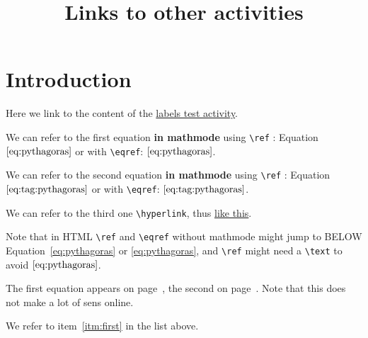 \documentclass{ximera}
\title{Links to other activities}
\begin{document}
\begin{abstract}
\end{abstract}
\maketitle
\label{xim:labelsFromOtherActivity}

\section{Introduction}
\label{sec:intro} %
 

Here we link to the content of the \hyperlink{xim:labels}{labels test activity}.


We can refer to the first equation \textbf{in mathmode} using \verb|\ref| : Equation~$\ref{eq:pythagoras}$ or with \verb|\eqref|: $\eqref{eq:pythagoras}$.

We can refer to the second equation \textbf{in mathmode} using \verb|\ref| : Equation~$\text{\ref{eq:tag:pythagoras}}$ or with \verb|\eqref|: $\eqref{eq:tag:pythagoras}$.

We can refer to the third one  \verb|\hyperlink|, thus \hyperlink{ht:pythagoras}{like this}.

Note that in HTML \verb|\ref| and \verb|\eqref| without mathmode might jump to BELOW Equation~\ref{eq:pythagoras} or \eqref{eq:pythagoras}, and
\verb|\ref| might need a \verb|\text| to avoid $\ref{eq:pythagoras}$.

The first equation appears on page~\pageref{eq:pythagoras}, the second on page~\pageref{eq:tag:pythagoras}. 
Note that this does not make a lot of sens online.

We refer to item~\ref{itm:first} in the list above.

\
\end{document}
